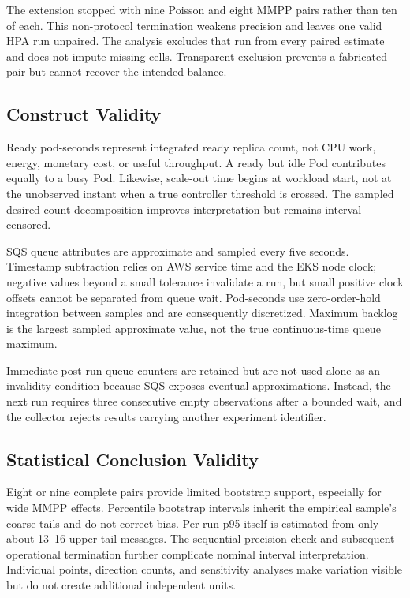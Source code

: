 \documentclass[conference]{IEEEtran}
\begin{document}
The extension stopped with nine Poisson and eight MMPP pairs rather than ten of
each. This non-protocol termination weakens precision and leaves one valid HPA
run unpaired. The analysis excludes that run from every paired estimate and does
not impute missing cells. Transparent exclusion prevents a fabricated pair but
cannot recover the intended balance.

\subsection{Construct Validity}

Ready pod-seconds represent integrated ready replica count, not CPU work,
energy, monetary cost, or useful throughput. A ready but idle Pod contributes
equally to a busy Pod. Likewise, scale-out time begins at workload start, not at
the unobserved instant when a true controller threshold is crossed. The sampled
desired-count decomposition improves interpretation but remains interval
censored.

SQS queue attributes are approximate and sampled every five seconds. Timestamp
subtraction relies on AWS service time and the EKS node clock; negative values
beyond a small tolerance invalidate a run, but small positive clock offsets
cannot be separated from queue wait. Pod-seconds use zero-order-hold integration
between samples and are consequently discretized. Maximum backlog is the largest
sampled approximate value, not the true continuous-time queue maximum.

Immediate post-run queue counters are retained but are not used alone as an
invalidity condition because SQS exposes eventual approximations. Instead, the
next run requires three consecutive empty observations after a bounded wait,
and the collector rejects results carrying another experiment identifier.

\subsection{Statistical Conclusion Validity}

Eight or nine complete pairs provide limited bootstrap support, especially for
wide MMPP effects. Percentile bootstrap intervals inherit the empirical sample's
coarse tails and do not correct bias. Per-run p95 itself is estimated from only
about 13--16 upper-tail messages. The sequential precision check and subsequent
operational termination further complicate nominal interval interpretation.
Individual points, direction counts, and sensitivity analyses make variation
visible but do not create additional independent units.
\end{document}
